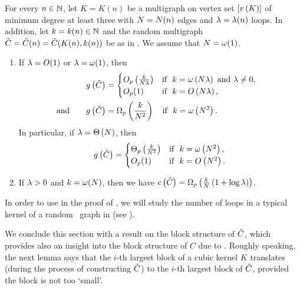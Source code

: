 \begin{lem}\label{CBlem:random_core2}
For every $n \in \mathbb{N}$, let $K=K(n)$ be a multigraph on vertex set $[v\left({K}\right)]$ of minimum degree at least three with $N=N(n)$ edges and $\lambda=\lambda(n)$ loops. In addition, let $k=k(n) \in \mathbb{N}$ and the random multigraph $\tilde{C}=\tilde{C}(n)=\tilde{C}(K(n),k(n))$ be as in . We assume that $N=\omega(1)$.
\begin{enumerate}
	\item\label{CBlem:random_core2_a}
If $\lambda=O(1)$ or $\lambda=\omega(1)$, then
		\begin{align*}
		g\left({\tilde{C}}\right)&=
		\begin{cases}
		O_p\left(\frac{k}{N \lambda}\right) &\text{if}~~ k=\omega\left(N \lambda\right) \text{ and } \lambda\neq 0,
		\\
		O_p(1) &\text{if}~~ k=O\left(N \lambda\right),
		\end{cases}
		\\
		\text{ and }~~~~~g\left({\tilde{C}}\right)&=
		\Omega_p\left(\frac{k}{N^2}\right) ~~~\text{if}~~ k=\omega\left(N ^2\right).~~~~~~~~~~~~~~~~~~
		\end{align*}
		In particular, if $\lambda=\Theta\left(N\right)$, then
		\begin{equation*}
		g\left({\tilde{C}}\right)=
		\begin{cases}
		\Theta_p\left(\frac{k}{N^2}\right) & \text{if}~~ k=\omega\left(N^2\right),
		\\
		O_p(1) & \text{if}~~ k=O\left(N ^2\right).
		\end{cases}
		\end{equation*}
		\item \label{CBlem:random_core2_b}
		If $\lambda> 0$ and $k=\omega(N)$,
		then we have $c\left({\tilde{C}}\right)=\Omega_p\left(\frac{k}{N}\left(1+\log\lambda\right)\right)$.
	\end{enumerate}
\end{lem}

In order to use  in the proof of , we will study the number of loops in a typical kernel of a random \pl\ graph in  (see ). 

We conclude this section with a result on the block structure of $\tilde{C}$, which provides also an insight into the block structure of $C$ due to . Roughly speaking, the next lemma says that the $i$-th largest block of a cubic kernel $K$ translates (during the process of constructing $\tilde{C}$) to the $i$-th largest block of $\tilde{C}$, provided the block is not too \lq small\rq. 

